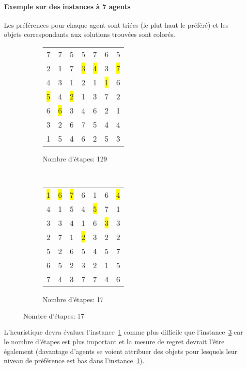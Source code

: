 \documentclass[a4paper, 10pt]{article}
\newcommand{\y}[1]{\colorbox{yellow}{#1}}
\begin{document}
	\paragraph{Exemple sur des instances à 7 agents}{Les préférences pour chaque agent sont triées (le plut haut le préféré) et les objets correspondants aux solutions trouvées sont colorés.
	
	\begin{figure}[h!]
		\centering
		\begin{subfigure}[h]{0.45\textwidth}
		\centering
		\begin{tabular}{|c c c c c c c|}
			\hline
			 7	& 7	& 5	& 5	& 7	& 6	& 5	\\
			 2	& 1	& 7	&\y{3}	&\y{4}	& 3	& \y{7}	\\
			 4	& 3	& 1	& 2	& 1	& \y{1}	& 6	\\
			 \y{5}	& 4	&\y{2}	& 1	& 3	& 7	& 2	\\
			 6	&\y{6}	& 3	& 4	& 6	& 2	& 1	\\
			 3	& 2	& 6	& 7	& 5	& 4	& 4	\\
			 1	& 5	& 4	& 6	& 2	& 5	& 3 \\
			\hline
		\end{tabular}
		\caption{Nombre d'étapes: 129}
		\label{tab:ex1}
		\end{subfigure}~
		\begin{subfigure}[h]{0.45\textwidth}
		\centering
		\begin{tabular}{|c c c c c c c|}
			\hline
			 \y{1}	& \y{6}	& \y{7}	&  6	&  1	&  6	& \y{4}	\\ 
 				4	&  1	&  5	&  4	& \y{5}	&  7	&  1	\\ 
			    3	&  3	&  4	&  1	&  6	& \y{3}	&  3	\\ 
			    2	&  7	&  1	& \y{2}	&  3	&  2	&  2	\\ 
			    5	&  2	&  6	&  5	&  4	&  5	&  7	\\ 
			    6	&  5	&  2	&  3	&  2	&  1	&  5	\\ 
			    7	&  4	&  3	&  7	&  7	&  4	&  6    \\ 
			\hline
		\end{tabular}
		\caption{Nombre d'étapes: 17}
		\label{tab:ex2}
		\end{subfigure}
	\end{figure}
	
	L'heuristique devra évaluer l'instance~\ref{tab:ex1} comme plus difficile que l'instance~\ref{tab:ex2} car le nombre d'étapes est plus important et la mesure de regret devrait l'être également (davantage d'agents se voient attribuer des objets pour lesquels leur niveau de préférence est bas dans l'instance~\ref{tab:ex1}).
	}\\
	
\end{document}
